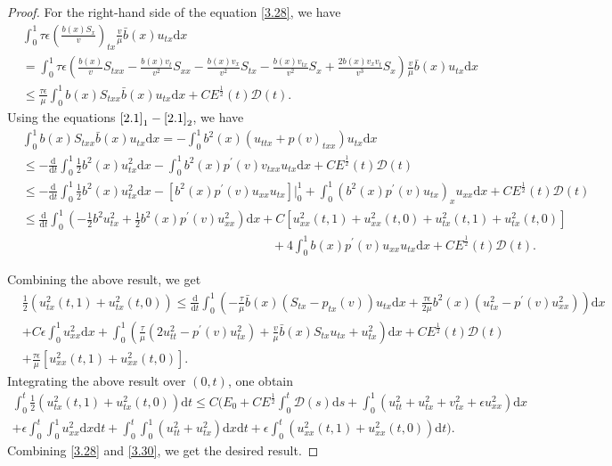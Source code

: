 \documentclass[10pt,a4paper]{amsart}
\newcommand{\dif}{\mathrm{d}}
\begin{document}
\begin{proof}
For the right-hand side of the equation \eqref{3.28}, we have
\begin{align*}
&\int_0^1 \tau \epsilon \left(\frac{b(x)S_x}{v}\right)_{tx} \frac{v}{\mu} \bar b(x)u_{tx}\dif x \\
&=\int_0^1 \tau \epsilon \left( \frac{b(x)}{v}S_{txx}-\frac{ b(x) v_t}{v^2}S_{xx}-\frac{b(x) v_x}{v^2} S_{tx}-\frac{b(x)v_{tx}}{v^2}S_x+\frac{2 b(x)v_x v_t}{v^3} S_x\right)\frac{v}{\mu} \bar b(x)u_{tx}\dif x\\
&\le \frac{\tau \epsilon}{\mu} \int_0^1 b(x) S_{txx} \bar b(x) u_{tx} \dif x  +CE^\frac{1}{2}(t)\mathcal D(t).
\end{align*}
Using the  equations $\eqref{2.1}_1-\eqref{2.1}_2$, we have
\begin{align*}
&\int_0^1 b(x) S_{txx} \bar b(x) u_{tx}\dif x=-\int_0^1 b^2(x)(u_{ttx}+p(v)_{txx})u_{tx}\dif x\\
&\le -\frac{\dif}{\dif t}\int_0^1 \frac{1}{2}b^2(x) u_{tx}^2\dif x-\int_0^1 b^2(x)p^\prime(v) v_{txx}u_{tx} \dif x+CE^\frac{1}{2}(t)\mathcal D(t)\\
&\le -\frac{\dif}{\dif t} \int_0^1 \frac{1}{2} b^2(x)u_{tx}^2 \dif x-\left[b^2(x)p^\prime(v) u_{xx}u_{tx} \right]\big|_0^1+\int_0^1 (b^2(x)p^\prime(v) u_{tx})_x u_{xx}\dif x +CE^\frac{1}{2}(t)\mathcal D(t)\\
&\le \frac{\dif}{\dif t} \int_0^1 (-\frac{1}{2} b^2 u_{tx}^2+\frac{1}{2} b^2(x)p^\prime(v) u_{xx}^2)\dif x+C[ u_{xx}^2(t,1)+u_{xx}^2(t,0)+u_{tx}^2(t,1)+u_{tx}^2(t,0)]\\
&\qquad\qquad\qquad\qquad\qquad\qquad\qquad\qquad\qquad\qquad+4\int_0^1 b(x)p^\prime(v) u_{xx}u_{tx}\dif x+CE^\frac{1}{2}(t)\mathcal D(t).
\end{align*}

Combining the above result, we get
\begin{align*}
&\frac{1}{2} (u_{tx}^2(t,1)+u_{tx}^2(t,0))\le \frac{\dif}{\dif t} \int_0^1 \left(-\frac{\tau}{\mu} \bar b(x) (S_{tx}-p_{tx}(v))u_{tx}\dif x+\frac{\tau \epsilon}{2\mu} b^2(x)(u_{tx}^2-p^\prime(v) u_{xx}^2)\right)\dif x\\
&+C\epsilon\int_0^1 u_{xx}^2 \dif x+ \int_0^1\left( \frac{\tau}{\mu}(2 u_{tt}^2-p^\prime(v) u_{tx}^2 )+ \frac{v}{\mu} \bar b(x) S_{tx} u_{tx}+ u_{tx}^2\right) \dif x+C E^\frac{1}{2}(t)\mathcal D(t)\\
&+\frac{\tau\epsilon}{\mu} [ u_{xx}^2(t,1)+u_{xx}^2(t,0)].
\end{align*}
Integrating the above result over $(0, t)$, one obtain
\begin{align}
\int_0^t \frac{1}{2}( u_{tx}^2(t, 1)+u_{tx}^2(t, 0) )\dif t 
\le C(E_0+CE^\frac{1}{2}\int_0^t \mathcal D(s)\dif s+\int_0^1 (u_{tt}^2+u_{tx}^2+v_{tx}^2+\epsilon u_{xx}^2)\dif x \nonumber\\
+ \epsilon \int_0^t \int_0^1 u_{xx}^2 \dif x \dif t + \int_0^t\int_0^1 (u_{tt}^2+u_{tx}^2)\dif x \dif t 
+\epsilon \int_0^t ( u_{xx}^2(t,1)+u_{xx}^2(t,0)) \dif t) . \label{3.30}
\end{align}
Combining \eqref{3.28} and \eqref{3.30},  we get the desired result.
\end{proof}
\end{document}
